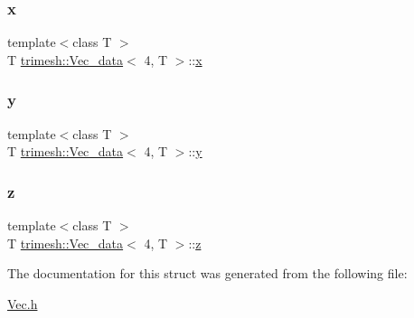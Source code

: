\mbox{\label{structtrimesh_1_1Vec__data_3_014_00_01T_01_4_a3a3c8ae9f8261f3e408cd4a556b8456a}} 
\subsubsection{\texorpdfstring{x}{x}}
{\footnotesize\ttfamily template$<$class T $>$ \\
T \hyperlink{structtrimesh_1_1Vec__data}{trimesh\+::\+Vec\+\_\+data}$<$ 4, T $>$\+::\hyperlink{namespacetrimesh_a3365d1b1a1bc5d8e9c844cf589a8c4a8}{x}}

\mbox{\label{structtrimesh_1_1Vec__data_3_014_00_01T_01_4_a8fce5387f67d163d6dadb97bf74d6f53}} 
\subsubsection{\texorpdfstring{y}{y}}
{\footnotesize\ttfamily template$<$class T $>$ \\
T \hyperlink{structtrimesh_1_1Vec__data}{trimesh\+::\+Vec\+\_\+data}$<$ 4, T $>$\+::\hyperlink{namespacetrimesh_a56b35d0eb7039be92fcc4867080c7419}{y}}

\mbox{\label{structtrimesh_1_1Vec__data_3_014_00_01T_01_4_a5a497d26f1a4a19f447034b8fe872522}} 
\subsubsection{\texorpdfstring{z}{z}}
{\footnotesize\ttfamily template$<$class T $>$ \\
T \hyperlink{structtrimesh_1_1Vec__data}{trimesh\+::\+Vec\+\_\+data}$<$ 4, T $>$\+::\hyperlink{namespacetrimesh_a42d0d86cc8db1d2be48121fe5e52fc67}{z}}



The documentation for this struct was generated from the following file\+:\begin{DoxyCompactItemize}
\item 
\hyperlink{Vec_8h}{Vec.\+h}\end{DoxyCompactItemize}
